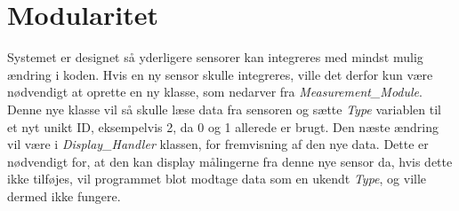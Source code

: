 \section{Modularitet}
Systemet er designet så yderligere sensorer kan integreres med mindst mulig ændring i koden. Hvis en ny sensor skulle integreres, ville det derfor kun være nødvendigt at oprette en ny klasse, som nedarver fra \textit{Measurement\_Module}. Denne nye klasse vil så skulle læse data fra sensoren og sætte \textit{Type} variablen til et nyt unikt ID, eksempelvis 2, da 0 og 1 allerede er brugt. Den næste ændring vil være i \textit{Display\_Handler} klassen, for fremvisning af den nye data. Dette er nødvendigt for, at den kan display målingerne fra denne nye sensor da, hvis dette ikke tilføjes, vil programmet blot modtage data som en ukendt \textit{Type}, og ville dermed ikke fungere.